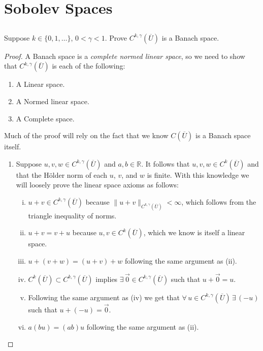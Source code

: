 \documentclass[11pt]{article}
\begin{document}
\pagestyle{fancy}
\fancyhead{}
\tableofcontents
\newpage
\setcounter{section}{4}

\section{Sobolev Spaces}
\subsection{}
Suppose $k \in \{0,1,\dots\}$, $0 < \gamma < 1$. Prove $C^{k,\gamma}(\overline{U})$ is a Banach space.
\begin{proof}
A Banach space is a \textit{complete normed linear space}, so we need to show that $C^{k,\gamma}(\overline{U})$
is each of the following:
	\begin{enumerate}[1.]
		\item A Linear space.
		\item A Normed linear space.
		\item A Complete space.
	\end{enumerate}
Much of the proof will rely on the fact that we know $C(\overline{U})$ is a Banach space itself.
	\begin{enumerate}[1.]
		\item Suppose $u,v,w \in C^{k,\gamma}(\overline{U})$ and $a,b \in \mathbb{R}$.
			It follows that $u,v,w \in C^k(\overline{U})$ and that the H\"{o}lder norm of
			each $u$, $v$, and $w$ is finite. With this knowledge we will loosely prove
			the linear space axioms as follows:
			\begin{enumerate}[(i)]
				\item $u+v \in C^{k,\gamma}(\overline{U})$ because $\|u+v\|_{C^{k,\gamma}(\overline{U})} < \infty$,
					which follows from the triangle inequality of norms.
				\item $u+v = v+u$ because $u,v \in C^k(\overline{U})$, which we know is itself a linear space.
				\item $u+(v+w) = (u+v)+w$ following the same argument as (ii).
				\item $C^k(\overline{U}) \subset C^{k,\gamma}(\overline{U})$ implies $\exists \, \vec{0} \in C^{k,\gamma}(\overline{U})$
					such that $u + \vec{0} = u$.
				\item Following the same argument as (iv) we get that $\forall \, u \in C^{k,\gamma}(\overline{U}) \, \exists \, (-u)$
					such that $u+(-u) = \vec{0}$.
				\item $a(bu) = (ab)u$ following the same argument as (ii).

\end{enumerate}
\end{enumerate}
\end{proof}
\end{document}
